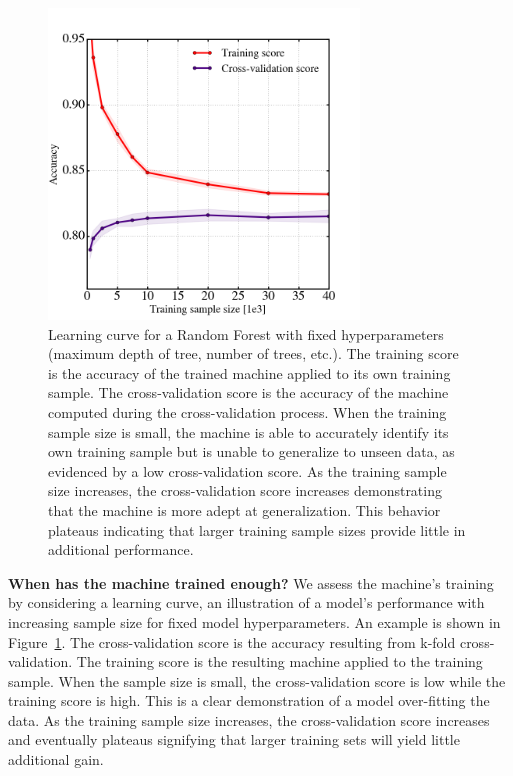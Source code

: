 \documentclass[twocolumn]{aastex6}
\begin{document}
\begin{figure}[t!]
\includegraphics[width=3.25in]{figures/learning_curve_RF.png}
\caption{Learning curve for a Random Forest with fixed hyperparameters (maximum depth of tree, number of trees, etc.). The training score is the accuracy of the trained machine applied to its own training sample. The cross-validation score is the accuracy of the machine computed during the cross-validation process. When the training sample size is small, the machine is able to accurately identify its own training sample but is unable to generalize to unseen data, as evidenced by a low cross-validation score. As the training sample size increases, the cross-validation score increases demonstrating that the machine is more adept at generalization. This behavior plateaus indicating that larger training sample sizes provide little in additional performance. \label{fig: learning curve}}
\end{figure}

\textbf{When has the machine trained enough?} 
We assess the machine's training by considering a learning curve, 
an illustration of a model's performance with increasing sample size for fixed 
model hyperparameters. An example is shown in Figure~\ref{fig: learning curve}.
 The cross-validation score is the accuracy resulting from k-fold cross-validation. 
The training score is the resulting machine applied to the training sample. 
When the sample size is small, the cross-validation score is low while the training score is high. 
This is a clear demonstration of a model over-fitting the data. 
As the training sample size increases, the cross-validation score increases and 
eventually plateaus signifying that 
larger training sets will  yield little additional gain. 
\end{document}
